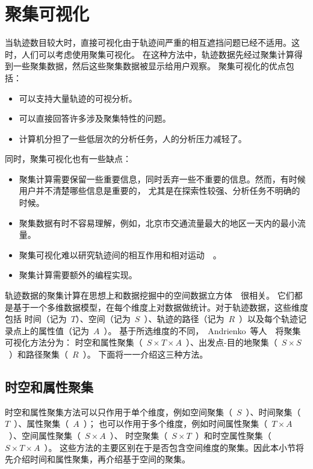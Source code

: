 \documentclass[12pt,twocolumn]{article}
\begin{document}
\section{聚集可视化}
\label{section:aggregration}

当轨迹数目较大时，直接可视化由于轨迹间严重的相互遮挡问题已经不适用。这时，人们可以考虑使用聚集可视化。
在这种方法中，轨迹数据先经过聚集计算得到一些聚集数据，然后这些聚集数据被显示给用户观察。
聚集可视化的优点包括：

\begin{itemize}
	\item 可以支持大量轨迹的可视分析。
	\item 可以直接回答许多涉及聚集特性的问题。
	\item 计算机分担了一些低层次的分析任务，人的分析压力减轻了。
\end{itemize}

同时，聚集可视化也有一些缺点：

\begin{itemize}
	\item 聚集计算需要保留一些重要信息，同时丢弃一些不重要的信息。然而，有时候用户并不清楚哪些信息是重要的，
尤其是在探索性较强、分析任务不明确的时候。
	\item 聚集数据有时不容易理解，例如，北京市交通流量最大的地区一天内的最小流量。
	\item 聚集可视化难以研究轨迹间的相互作用和相对运动~\citep{AndrienkoA2010a}~。
	\item 聚集计算需要额外的编程实现。
\end{itemize}

轨迹数据的聚集计算在思想上和数据挖掘中的空间数据立方体~\citep{HanSK1998}~很相关。
它们都是基于一个多维数据模型，在每个维度上对数据做统计。对于轨迹数据，这些维度包括
时间（记为~$T$）、空间（记为~$S$~）、轨迹的路径（记为~$R$~）以及每个轨迹记录点上的属性值（记为~$A$~）。
基于所选维度的不同，~Andrienko~等人~\citep{AndrienkoA2010a}~将聚集可视化方法分为：
时空和属性聚集（~$S \times T \times A$~）、出发点-目的地聚集（~$S \times S$~）和路径聚集（~$R$~）。
下面将一一介绍这三种方法。

\subsection{时空和属性聚集}
\label{subsection:aggregation_sta}

时空和属性聚集方法可以只作用于单个维度，例如空间聚集（~$S$~）、时间聚集（~$T$~）、属性聚集（~$A$~）；
也可以作用于多个维度，例如时间属性聚集（~$T \times A$~）、空间属性聚集（~$S \times A$~）、
时空聚集（~$S \times T$~）和时空属性聚集（~$S \times T \times A$~）。
这些方法的主要区别在于是否包含空间维度的聚集。因此本小节将先介绍时间和属性聚集，再介绍基于空间的聚集。
\end{document}

